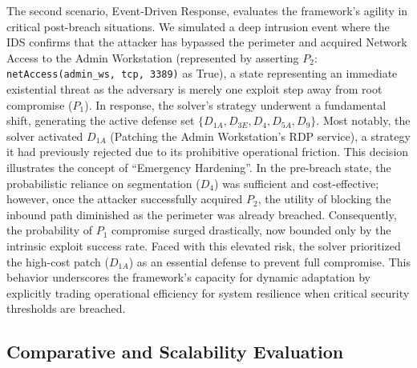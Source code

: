 \documentclass[conference]{IEEEtran}
\theoremstyle{definition} %
\theoremstyle{plain} %
\begin{document}
The second scenario, Event-Driven Response, evaluates the framework's agility in critical post-breach situations. We simulated a deep intrusion event where the IDS confirms that the attacker has bypassed the perimeter and acquired Network Access to the Admin Workstation (represented by asserting $P_2$: \texttt{netAccess(admin\_ws, tcp, 3389)} as True), a state representing an immediate existential threat as the adversary is merely one exploit step away from root compromise ($P_1$). In response, the solver's strategy underwent a fundamental shift, generating the active defense set $\{ D_{1A},  D_{3E}, D_4, D_{5A}, D_9 \}$. Most notably, the solver activated $D_{1A}$ (Patching the Admin Workstation's RDP service), a strategy it had previously rejected due to its prohibitive operational friction. This decision illustrates the concept of ``Emergency Hardening''. In the pre-breach state, the probabilistic reliance on segmentation ($D_4$) was sufficient and cost-effective; however, once the attacker successfully acquired $P_2$, the utility of blocking the inbound path diminished as the perimeter was already breached. Consequently, the probability of $P_1$ compromise surged drastically, now bounded only by the intrinsic exploit success rate. Faced with this elevated risk, the solver prioritized the high-cost patch ($D_{1A}$) as an essential defense to prevent full compromise. This behavior underscores the framework's capacity for dynamic adaptation by explicitly trading operational efficiency for system resilience when critical security thresholds are breached.

\subsection{Comparative and Scalability Evaluation}
\end{document}
